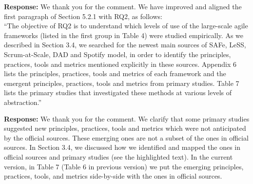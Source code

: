 \documentclass[a4paper,twoside,11pt]{reviewresponse}
\begin{document}
\textbf{Response:}
We thank you for the comment. We have improved and aligned the first paragraph of Section 5.2.1 with RQ2, as follows: \\
``The objective of RQ2 is to understand which levels of use of the large-scale agile frameworks (listed in the first group in Table 4) were studied empirically. As we described in Section 3.4, we searched for the newest main sources of SAFe, LeSS, Scrum-at-Scale, DAD and Spotify model, in order to identify the principles, practices, tools and metrics mentioned explicitly in these sources. Appendix 6 lists the principles, practices, tools and metrics of each framework and the emergent principles, practices, tools and metrics from primary studies. Table 7 lists the primary studies that investigated these methods at various levels of abstraction.''

\textbf{Response:}
We thank you for the comment. We clarify that some primary studies suggested new principles, practices, tools and metrics which were not anticipated by the official sources. These emerging ones are not a subset of the ones in official sources. In Section 3.4, we discussed how we identified and mapped the ones in official sources and primary studies (see the highlighted text). In the current version, in Table 7 (Table 6 in previous version) we put the emerging principles, practices, tools, and metrics side-by-side with the ones in official sources. 
\end{document}
